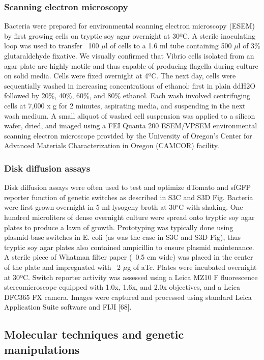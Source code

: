 \subsubsection{Scanning electron microscopy} 
Bacteria were prepared for environmental scanning electron microscopy (ESEM) by first growing cells on tryptic soy agar overnight at 30ºC. A sterile inoculating loop was used to transfer ~100 $\mu$l of cells to a 1.6 ml tube containing 500 $\mu$l of 3\% glutaraldehyde fixative. We visually confirmed that Vibrio cells isolated from an agar plate are highly motile and thus capable of producing flagella during culture on solid media. Cells were fixed overnight at 4ºC. The next day, cells were sequentially washed in increasing concentrations of ethanol: first in plain ddH2O followed by 20\%, 40\%, 60\%, and 80\% ethanol. Each wash involved centrifuging cells at 7,000 x g for 2 minutes, aspirating media, and suspending in the next wash medium. A small aliquot of washed cell suspension was applied to a silicon wafer, dried, and imaged using a FEI Quanta 200 ESEM/VPSEM environmental scanning electron microscope provided by the University of Oregon's Center for Advanced Materials Characterization in Oregon (CAMCOR) facility. 

\subsubsection{Disk diffusion assays}
Disk diffusion assays were often used to test and optimize dTomato and sfGFP reporter function of genetic switches as described in S3C and S3D Fig. Bacteria were first grown overnight in 5 ml lysogeny broth at 30$^\circ$C with shaking. One hundred microliters of dense overnight culture were spread onto tryptic soy agar plates to produce a lawn of growth. Prototyping was typically done using plasmid-base switches in E. coli (as was the case in S3C and S3D Fig), thus tryptic soy agar plates also contained ampicillin to ensure plasmid maintenance. A sterile piece of Whatman filter paper (~0.5 cm wide) was placed in the center of the plate and impregnated with ~2 $\mu$g of aTc. Plates were incubated overnight at 30ºC. Switch reporter activity was assessed using a Leica MZ10 F fluorescence stereomicroscope equipped with 1.0x, 1.6x, and 2.0x objectives, and a Leica DFC365 FX camera. Images were captured and processed using standard Leica Application Suite software and FIJI [68].   

\subsection{Molecular techniques and genetic manipulations}

